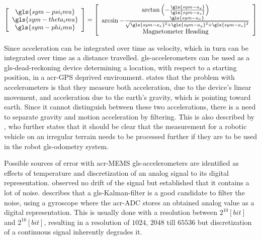 \begin{equation}
    \label{eq:roll_and_pitch_accelerometer}
    \left[ \begin{array}{c}
               \gls{sym-psi_imu}   \\
               \gls{sym-theta_imu} \\
               \gls{sym-phi_imu}
    \end{array} \right] =
    \left[\begin{array}{c}
              \arctan \left(-\frac{\gls{sym-a_y}}{\gls{sym-a_z}}\right)                                   \\
              \arcsin - \frac{\gls{sym-a_x}}{\sqrt{\gls{sym-a_x}^2 + \gls{sym-a_y}^2 + \gls{sym-a_z}^2 }} \\
              \text{Magnetometer Heading}
    \end{array}\right]
\end{equation}

Since acceleration can be integrated over time as velocity, which in turn can be integrated over time as a distance
travelled. \gls{gls-accelerometer}s can be used as a \gls{gls-dead-reckoning} device determining a location, with
respect to a starting position, in a \gls{acr-GPS} deprived environment. \citet{abyarjoo_implementing_2015} states that
the problem with accelerometers is that they measure both acceleration, due to the device's linear movement, and
acceleration due to the earth's gravity, which is pointing toward earth. Since it cannot distinguish between these two
accelerations, there is a need to separate gravity and motion acceleration by filtering. This is also described by
\citet{nistler_gravity_2011}, who further states that it should be clear that the measurement for a robotic vehicle on
an irregular terrain needs to be processed further if they are to be used in the robot \gls{gls-odometry} system.

Possible sources of error with \gls{acr-MEMS} \gls{gls-accelerometer}s are identified as effects of temperature and
discretization of an analog signal to its digital representation. \citet{abyarjoo_implementing_2015} observed no drift
of the signal but established that it contains a lot of noise. \citet{kownacki_optimization_2011} describes that a
\gls{gls-Kalman-filter} is a good candidate to filter the noise, using a gyroscope where the \gls{acr-ADC}
stores an obtained analog value as a digital representation. This is usually done with a resolution between \( 2^{10}
[bit] \) and \( 2^{16} [bit] \), resulting in a resolution of \( 1024 \), \( 2048 \) till \( 65536 \) but
discretization of a continuous signal inherently degrades it.


